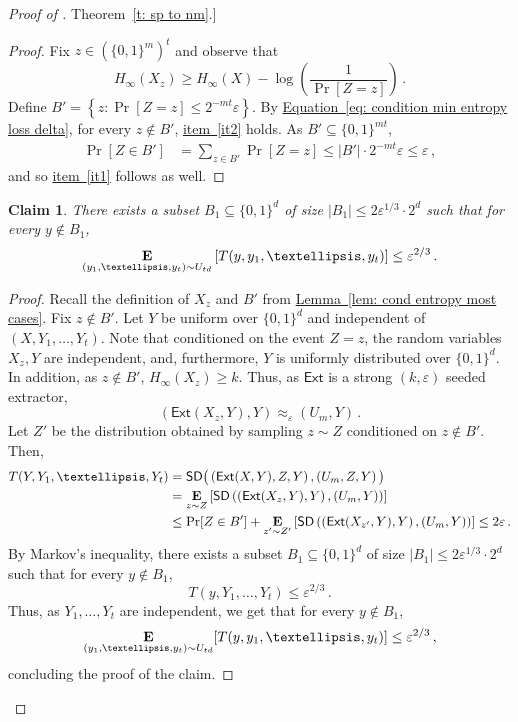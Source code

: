 \documentclass[11pt]{article}
\numberwithin{equation}{section}
\newtheorem{claim}[theorem]{Claim}
\theoremstyle{definition}
\theoremstyle{plain}
\newcommand{\expref}[2]{\hyperref[#2]{#1~\ref{#2}}}
\newcommand{\expeqref}[2]{\hyperref[#2]{#1~\eqref{#2}}}
\newcommand{\ext}{\mathsf{Ext}}
\newcommand{\eps}{\varepsilon}
\newcommand{\set}[1]{\left\{{#1}\right\}}
\newcommand{\E}{\mathop{\bf E\/}}
\newcommand{\minent}[1]{H_{\infty}(#1)}
\def\SD{\ensuremath{\mathsf{SD}}}
\begin{document}
\begin{proof}[Proof of \expref{Theorem}{t: sp to nm}.]
\begin{proof}
%
	
	Fix $z\in (\{0,1\}^m)^t$ and observe that  
	\begin{equation}\label{eq: condition min entropy loss delta}
		\minent{ X_{z}} \geq \minent{X} - \log\left(\frac{1}{\Pr[Z = z]}\right)\,.
	\end{equation}
	Define
	$
	B' = \set{z : \Pr[Z = z] \le 2^{-mt}  \eps}.
	$
	By \expeqref{Equation}{eq: condition min entropy loss delta}, for every $z \notin B'$, \expeqref{item}{it2} holds.
 	As $B' \subseteq \{0,1\}^{mt}$,
\begin{align*}
	\Pr[Z\in B'] &= \sum_{z \in B'}\Pr[Z = z] 
	\leq |B'| \cdot 2^{-mt}  \eps \le \eps\,,
\end{align*}
and so \expeqref{item}{it1} follows as well.
\end{proof}

\begin{claim}\label{claim:average behavior}
There exists a subset $B_1 \subseteq \{0,1\}^d$ of size $|B_1| \le 2\eps^{1/3} \cdot 2^d$ such that for every $y \notin B_1$,
\[
\E_{(y_1,\ldots,y_t) \sim U_{td}}\left[T(y,y_1,\ldots,y_t)\right] \le \eps^{2/3}\,.
\]
\end{claim}

\begin{proof}
Recall the definition of $X_{z}$ and $B'$ from \expref{Lemma}{lem: cond entropy most cases}. 
Fix $z \not\in B'$. Let $Y$ be uniform over $\{0,1\}^d$ and independent of $(X,Y_1,\ldots, Y_t)$. Note that conditioned on the event $Z = z$, the random variables $X_{z}, Y$ are independent, and, furthermore, $Y$ is uniformly distributed over $\{0,1\}^d$. In addition, as $z \not\in B'$, $\minent{X_{z}} \ge k$. Thus, as $\ext$ is a strong $(k,\eps)$ seeded extractor,
\[
\left( \ext(X_{z},Y), Y \right) \approx_\eps \left( U_m, Y \right)\,.
\]
Let $Z'$ be the distribution obtained by sampling $z \sim Z$ conditioned on $z \notin B'$. Then,
\begin{align*}
T(Y,Y_1,\ldots,Y_t) &= \SD\big( \left(\ext(X,Y), Z , Y \right),  \left(U_m, Z, Y\right) \big) \\
&= \E_{z \sim Z} \left[ \SD\left( \left(\ext(X_{z},Y), Y \right),
          \left(U_m, Y \right)
   \right) \right] \\
&\le \Pr[Z \in B'] + \E_{z' \sim Z'}\left[ \SD\left( \left(\ext(X_{z'},Y), Y \right),
          \left(U_m, Y \right)
   \right) \right] \le 2\eps\,.
\end{align*}
By Markov's inequality, there exists a subset $B_1 \subseteq \{0,1\}^d$ of size $|B_1| \le 2\eps^{1/3} \cdot 2^d$ such that for every $y \notin B_1$,
\[
T(y,Y_1,\ldots,Y_t) \leq \eps^{2/3}\,.
\]
Thus, as $Y_1,\ldots, Y_t$ are independent, we get that for every $y \notin B_1$,
\[
\E_{(y_1,\ldots,y_t) \sim U_{td}}[T(y,y_1,\ldots,y_t)] \le \eps^{2/3}\,,
\]
concluding the proof of the claim.
\end{proof}


\end{proof}
\end{document}
